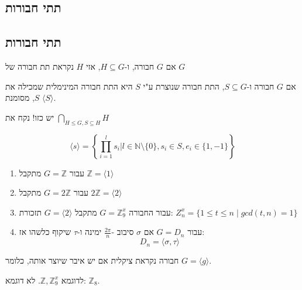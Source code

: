 \documentclass{tstextbook}
\begin{document}
\subsection{תתי חבורות}

\subsection{תתי חבורות}

\begin{definition}[תת חבורה]
אם \(G\) חבורה, ו-\(H\subseteq G\), אזי \(H\) נקראת תת חבורה של \(G\)

\end{definition}
\begin{definition}
אם \(G\) חבורה ו-\(S\subseteq G\), התת חבורה שנוצרת ע"י \(S\) היא התת חבורה המינימלית שמכילה את \(S\), מסומנת \(\langle S\rangle\).

\end{definition}
\begin{remark}
יש כזו! נקח את \(\bigcap_{{H\leq G,S\subseteq H}}H\)

\end{remark}
\begin{proposition}
$$\langle s\rangle=\left\{  \prod_{i=1}^{l}s_{i}\bigg| l\in\mathbb{N}\setminus \{ 0 \},s_{i}\in S,e_{i} \in \{ 1,-1 \}  \right\}$$

\end{proposition}
\begin{example}
  \begin{enumerate}
    \item עבור \(G=\mathbb{Z}\) מתקבל \(\mathbb{Z}=\langle 1\rangle\)


    \item עבור \(G=2\mathbb{Z}\) מתקבל \(2\mathbb{Z}=\langle 2\rangle\)


    \item עבור החבורה \(G=\mathbb{Z}_{9}^x\) מתקבל \(G=\langle 2\rangle\) 
תזכורת: \(Z_{n}^x=\{ 1\leq t\leq n \;\big|\;gcd(t,n)=1 \}\)


    \item עבור \(G=D_{n}\) אם \(\sigma\) סיבוב -\(\frac{2\pi}{n}\) ימינה ו-\(\tau\) שיקוף כלשהו אז: 
$$D_{n}=\langle \sigma,\tau\rangle $$


  \end{enumerate}
\end{example}
\begin{definition}
חבורה נקראת ציקלית אם יש איבר שיוצר אותה, כלומר \(G=\langle g\rangle\). 

\end{definition}
לדוגמא \(\mathbb{Z},\mathbb{Z}_{9}^x\).
לא דוגמא: \(\mathbb{Z}_{8}\).
\end{document}
